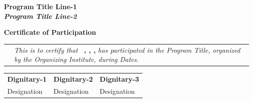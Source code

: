 \documentclass[12pt]{article}
\begin{document}
{	\vspace{0.4cm}
	
	\begin{center}
		\textbf{\huge \color{red} Program Title Line-1}\\ 
		\vspace{0.2cm}
		\textbf{\huge \textit{\color{red} Program Title Line-2}}\\
	\end{center}
	
	\vspace{0.01cm}
	
	\begin{center}
	\calligra \Huge\textbf{\color{gold} Certificate of Participation}
	\end{center}
	
	\begin{tabularx}{0.80\linewidth}{ l X }
		& 
		\Large
		{\textit{This is to certify that} 
			     \textbf{\color{blue} \prefix~\name, \inst, \place,}
			     \textit{has participated in the \textit{Program Title}, 
				organized by the Organizing Institute, during Dates.}}
		\\
	\end{tabularx}
	\hspace{0.5cm}
	
	\vspace{0.8cm}
	\begin{table}[b]
		\centering
		\begin{tabular}{>{\centering\arraybackslash}p{7cm}>{\centering\arraybackslash}p{7cm}>{\centering\arraybackslash}p{7cm}}
			\textbf{\Large Dignitary-1} & \textbf{\Large Dignitary-2} & \textbf{\Large Dignitary-3} \\
			\large Designation        & \large Designation             & \large Designation   \\                      
		\end{tabular}
	\end{table}
	\newpage
}
\end{document}
